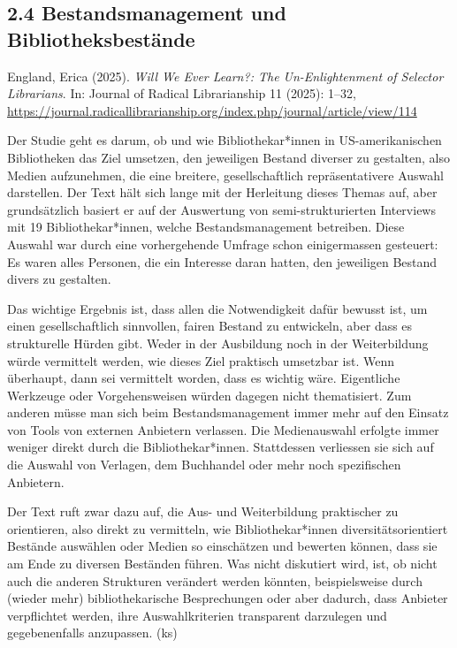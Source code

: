 \documentclass[a4paper,
fontsize=11pt,
oneside,
numbers=noperiodatend,
parskip=half-,
bibliography=totoc,
final
]{scrartcl}
\begin{document}
\subsection{2.4 Bestandsmanagement und
Bibliotheksbestände}\label{bestandsmanagement-und-bibliotheksbestuxe4nde}

England, Erica (2025). \emph{Will We Ever Learn?: The Un-Enlightenment
of Selector Librarians}. In: Journal of Radical Librarianship 11 (2025):
1--32,
\url{https://journal.radicallibrarianship.org/index.php/journal/article/view/114}

Der Studie geht es darum, ob und wie Bibliothekar*innen in
US-amerikanischen Bibliotheken das Ziel umsetzen, den jeweiligen Bestand
diverser zu gestalten, also Medien aufzunehmen, die eine breitere,
gesellschaftlich repräsentativere Auswahl darstellen. Der Text hält sich
lange mit der Herleitung dieses Themas auf, aber grundsätzlich basiert
er auf der Auswertung von semi-strukturierten Interviews mit 19
Bibliothekar*innen, welche Bestandsmanagement betreiben. Diese Auswahl
war durch eine vorhergehende Umfrage schon einigermassen gesteuert: Es
waren alles Personen, die ein Interesse daran hatten, den jeweiligen
Bestand divers zu gestalten.

Das wichtige Ergebnis ist, dass allen die Notwendigkeit dafür bewusst
ist, um einen gesellschaftlich sinnvollen, fairen Bestand zu entwickeln,
aber dass es strukturelle Hürden gibt. Weder in der Ausbildung noch in
der Weiterbildung würde vermittelt werden, wie dieses Ziel praktisch
umsetzbar ist. Wenn überhaupt, dann sei vermittelt worden, dass es
wichtig wäre. Eigentliche Werkzeuge oder Vorgehensweisen würden dagegen
nicht thematisiert. Zum anderen müsse man sich beim Bestandsmanagement
immer mehr auf den Einsatz von Tools von externen Anbietern verlassen.
Die Medienauswahl erfolgte immer weniger direkt durch die
Bibliothekar*innen. Stattdessen verliessen sie sich auf die Auswahl von
Verlagen, dem Buchhandel oder mehr noch spezifischen Anbietern.

Der Text ruft zwar dazu auf, die Aus- und Weiterbildung praktischer zu
orientieren, also direkt zu vermitteln, wie Bibliothekar*innen
diversitätsorientiert Bestände auswählen oder Medien so einschätzen und
bewerten können, dass sie am Ende zu diversen Beständen führen. Was
nicht diskutiert wird, ist, ob nicht auch die anderen Strukturen
verändert werden könnten, beispielsweise durch (wieder mehr)
bibliothekarische Besprechungen oder aber dadurch, dass Anbieter
verpflichtet werden, ihre Auswahlkriterien transparent darzulegen und
gegebenenfalls anzupassen. (ks)
\end{document}

